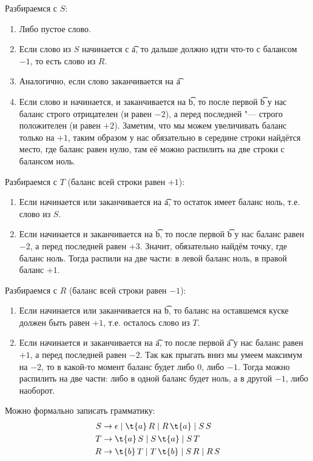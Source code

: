 		Разбираемся с $S$:
		\begin{enumerate}
			\item
				Либо пустое слово.
			\item
				Если слово из $S$ начинается с \t{a}, то дальше должно идти что-то с балансом $-1$,
				то есть слово из $R$.
			\item
				Аналогично, если слово заканчивается на \t{a}
			\item
				Если слово и начинается, и заканчивается на \t{b}, то после первой \t{b} у нас
				баланс строго отрицателен (и равен $-2$), а перед последней "--- строго положителен
				(и равен $+2$).
				Заметим, что мы можем увеличивать баланс только на $+1$, таким образом у нас обязательно
				в середине строки найдётся место, где баланс равен нулю, там её можно распилить
				на две строки с балансом ноль.
		\end{enumerate}
		Разбираемся с $T$ (баланс всей строки равен $+1$):
		\begin{enumerate}
			\item
				Если начинается или заканчивается на \t{a}, то остаток имеет баланс ноль, т.е. слово из $S$.
			\item
				Если начинается и заканчивается на \t{b}, то после первой \t{b} у нас
				баланс равен $-2$, а перед последней равен $+3$.
				Значит, обязательно найдём точку, где баланс ноль.
				Тогда распили на две части: в левой баланс ноль, в правой баланс $+1$.
		\end{enumerate}
		Разбираемся с $R$ (баланс всей строки равен $-1$):
		\begin{enumerate}
			\item
				Если начинается или заканчивается на \t{b}, то баланс на оставшемся куске должен быть равен $+1$,
				т.е. осталось слово из $T$.
			\item
				Если начинается и заканчивается на \t{a}, то после первой \t{a} у нас
				баланс равен $+1$, а перед последней равен $-2$.
				Так как прыгать вниз мы умеем максимум на $-2$, то в какой-то момент баланс будет
				либо $0$, либо $-1$.
				Тогда можно распилить на две части: либо в одной баланс будет ноль, а в другой $-1$,
				либо наоборот.
		\end{enumerate}
		Можно формально записать грамматику:
		\begin{align*}
			S &\to \epsilon \mid \t{a}\,R \mid R\,\t{a} \mid S\,S \\
			T &\to \t{a}\,S \mid S\,\t{a} \mid S\,T \\
			R &\to \t{b}\,T \mid T\,\t{b} \mid S\,R \mid R\,S
		\end{align*}

